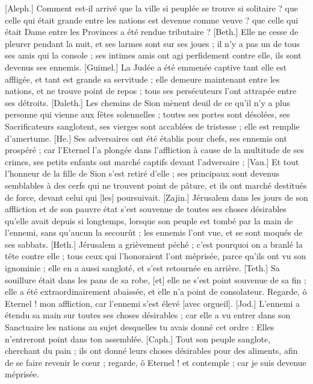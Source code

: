 \BFont
\begin{multicols}{2}
\VerseOne{}[Aleph.] Comment est-il arrivé que la ville si peuplée se trouve si solitaire ? que celle qui était grande entre les nations est devenue comme veuve ? que celle qui était Dame entre les Provinces a été rendue tributaire ?
[Beth.] Elle ne cesse de pleurer pendant la nuit, et ses larmes sont sur ses joues ; il n'y a pas un de tous ses amis qui la console ; ses intimes amis ont agi perfidement contre elle, ils sont devenus ses ennemis.
[Guimel.] La Judée a été emmenée captive tant elle est affligée, et tant est grande sa servitude ; elle demeure maintenant entre les nations, et ne trouve point de repos ; tous ses persécuteurs l'ont attrapée entre ses détroits.
[Daleth.] Les chemins de Sion mènent deuil de ce qu'il n'y a plus personne qui vienne aux fêtes solennelles ; toutes ses portes sont désolées, ses Sacrificateurs sanglotent, ses vierges sont accablées de tristesse ; elle est remplie d'amertume.
[He.] Ses adversaires ont été établis pour chefs, ses ennemis ont prospéré ; car l'Eternel l'a plongée dans l'affliction à cause de la multitude de ses crimes, ses petits enfants ont marché captifs devant l'adversaire ;
[Vau.] Et tout l'honneur de la fille de Sion s'est retiré d'elle ; ses principaux sont devenus semblables à des cerfs qui ne trouvent point de pâture, et ils ont marché destitués de force, devant celui qui [les] poursuivait.
[Zajin.] Jérusalem dans les jours de son affliction et de son pauvre état s’est souvenue de toutes ses choses désirables qu’elle avait depuis si longtemps, lorsque son peuple est tombé par la main de l’ennemi, sans qu’aucun la secourût ; les ennemis l’ont vue, et se sont moqués de ses sabbats.
[Heth.] Jérusalem a grièvement péché ; c'est pourquoi on a branlé la tête contre elle ; tous ceux qui l'honoraient l'ont méprisée, parce qu'ils ont vu son ignominie ; elle en a aussi sangloté, et s'est retournée en arrière.
[Teth.] Sa souillure était dans les pans de sa robe, [et] elle ne s'est point souvenue de sa fin ; elle a été extraordinairement abaissée, et elle n'a point de consolateur. Regarde, ô Eternel ! mon affliction, car l'ennemi s'est élevé [avec orgueil].
[Jod.] L'ennemi a étendu sa main sur toutes ses choses désirables ; car elle a vu entrer dans son Sanctuaire les nations au sujet desquelles tu avais donné cet ordre : Elles n'entreront point dans ton assemblée.
[Caph.] Tout son peuple sanglote, cherchant du pain ; ils ont donné leurs choses désirables pour des aliments, afin de se faire revenir le cœur ; regarde, ô Eternel ! et contemple ; car je suis devenue méprisée.

\end{multicols}
